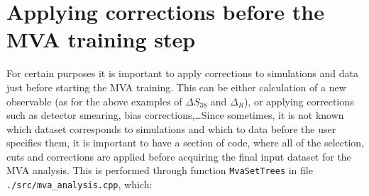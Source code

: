 \documentclass[12pt,a4paper]{report}
\begin{document}
\section{Applying corrections before the MVA training step}
For certain purposes it is important to apply corrections to simulations and data just before starting the MVA training. This can be either calculation of a new observable (as for the above examples of $\Delta S_{38}$ and $\Delta_R$), or applying corrections such as detector smearing, bias corrections,\dots Since sometimes, it is not known which dataset corresponds to simulations and which to data before the user specifies them, it is important to have a section of code, where all of the selection, cuts and corrections are applied before acquiring the final input dataset for the MVA analysis. This is performed through function \texttt{MvaSetTrees} in file \texttt{./src/mva\_analysis.cpp}, which:
\end{document}
